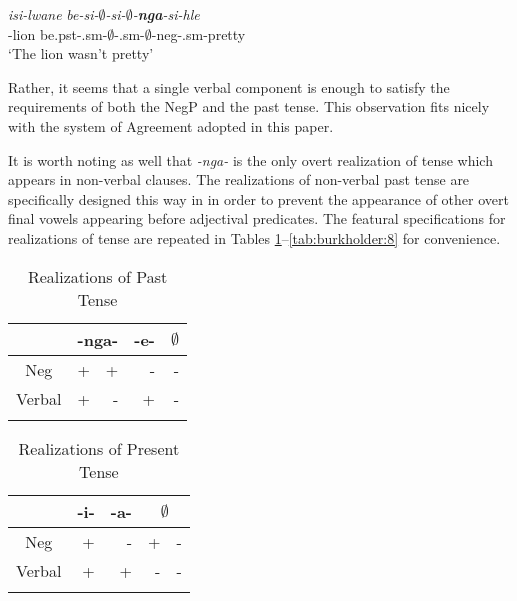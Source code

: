 \documentclass[output=paper]{langsci/langscibook}
\newcommand{\nga}[0]{\textit{-nga- }}
\begin{document}
\begin{exe}
\ex\label{ex:burkholder:23} \gll *\textit{isi-lwane} \textit{be-si-$\emptyset$-si-$\emptyset$-{\bf nga}-si-hle}\\
       -lion be.{\sc pst}-.{\sc sm}-$\emptyset$-.{\sc sm}-$\emptyset$-{\sc neg}-.{\sc sm}-pretty\\
    \glt `The lion wasn't pretty' 
\end{exe}

Rather, it seems that a single verbal component is enough to satisfy the requirements of both the NegP and the past tense. This observation fits nicely with the system of Agreement adopted in this paper.

It is worth noting as well that \nga is the only overt realization of tense which appears in non-verbal clauses. The realizations of non-verbal past tense are specifically designed this way in  in order to prevent the appearance of other overt final vowels appearing before adjectival predicates. The featural specifications for realizations of tense are repeated in Tables \ref{tab:burkholder:6}--\ref{tab:burkholder:8} for convenience. 


\begin{table}
\caption{Realizations of Past Tense} %
\centering %
\begin{tabular}{c rr|r|r} %
\lsptoprule%
 &\multicolumn{2}{c}{-nga-}& \multicolumn{1}{|c}{-e-}& \multicolumn{1}{|c}{$\emptyset$} \\ %
\midrule%
Neg & + & + & - & -\\ %
Verbal & + & - & +& -\\[1ex] %
\lspbottomrule%
\end{tabular} 
\label{tab:burkholder:6}
\end{table} 





\begin{table}
\caption{Realizations of Present Tense} %
\centering %
\begin{tabular}{c r|r|rr} %
\lsptoprule%
 &\multicolumn{1}{c}{-i-}& \multicolumn{1}{|c|}{-a-}& \multicolumn{2}{|c}{$\emptyset$} \\ %
\midrule%
Neg & + & - & + & -\\ %
Verbal & + & + & -& -\\[1ex] %
\lspbottomrule%
\end{tabular} 
\label{tab:burkholder:7}
\end{table} 
\end{document}

